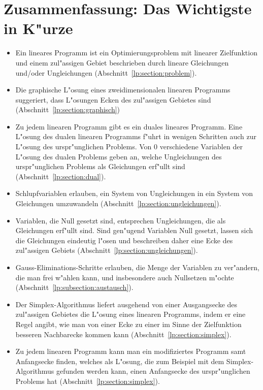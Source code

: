 \section{Zusammenfassung: Das Wichtigste in K"urze}
\begin{itemize}
\item Ein lineares Programm ist ein Optimierungsproblem mit linearer
Zielfunktion
und einem zul"assigen Gebiet beschrieben durch lineare Gleichungen und/oder 
Ungleichungen (Abschnitt~\ref{lp:section:problem}).
\item Die graphische L"osung eines zweidimensionalen linearen Programms
suggeriert, dass L"osungen Ecken des zul"assigen Gebietes sind
(Abschnitt~\ref{lp:section:graphisch})
\item Zu jedem linearen Programm gibt es ein duales lineares Programm.
Eine L"osung des dualen linearen Programms f"uhrt in wenigen Schritten auch
zur L"osung des urspr"unglichen Problems.
Von $0$ verschiedene Variablen der L"osung des dualen Problems geben an,
welche Ungleichungen des urspr"unglichen Problems als Gleichungen erf"ullt sind
(Abschnitt~\ref{lp:section:dual}).
\item Schlupfvariablen erlauben, ein System von Ungleichungen in ein System von
Gleichungen umzuwandeln (Abschnitt~\ref{lp:section:ungleichungen}).
\item Variablen, die Null gesetzt sind, entsprechen Ungleichungen, die
als Gleichungen erf"ullt sind. Sind gen"ugend Variablen Null gesetzt,
lassen sich die Gleichungen eindeutig l"osen und beschreiben daher eine
Ecke des zul"assigen Gebiets (Abschnitt~\ref{lp:section:ungleichungen}).
\item Gauss-Eliminations-Schritte erlauben, die Menge der Variablen zu
ver"andern, die man frei w"ahlen kann, und insbesondere auch Nullsetzen
m"ochte (Abschnitt~\ref{lp:subsection:austausch}).
\item Der Simplex-Algorithmus liefert ausgehend von einer Ausgangsecke des
zul"assigen Gebietes die L"osung eines linearen Programms, indem er
eine Regel angibt, wie man von einer Ecke zu einer im Sinne der Zielfunktion
besseren Nachbarecke kommen kann (Abschnitt~\ref{lp:section:simplex}).
\item Zu jedem linearen Programm kann man ein modifiziertes Programm
samt Anfangsecke finden, welches als L"osung, die zum Beispiel mit dem
Simplex-Algorithmus gefunden werden kann, einen Anfangsecke des 
urspr"unglichen Problems hat (Abschnitt~\ref{lp:section:simplex}).
\end{itemize}
